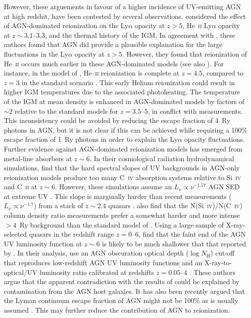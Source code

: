 \documentclass[a4paper,fleqn,usenatbib]{mnras}
\begin{document}
However, these arguements in favour of a higher incidence of
UV-emitting AGN at high redshit, have been contested by several
observations.  \citet{2016arXiv160706467D} considered the effect of
AGN-dominated reionization on the Ly$\alpha$ opacity at $z>5$,
He~\textsc{ii} Ly$\alpha$ opacity at $z\sim 3.1$--$3.3$, and the
thermal history of the IGM.  In agreement with
\citet{2015MNRAS.453.2943C}, these authors found that AGN did provide
a plausible explanation for the large fluctuations in the Ly$\alpha$
opacity at $z>5$.  However, they found that reionization of
He~\textsc{ii} occurs much earlier in these AGN-dominated models (see
also \citealt{2016arXiv160602719M}).  For instance, in the model of
\citet{2015ApJ...813L...8M}, He~\textsc{ii} reionization is complete
at $z=4.5$, compared to $z=3$ in the standard scenario
\citep{2012ApJ...746..125H}.  This early Helium reionization could
result in higher IGM temperatures due to the associated photoheating.
The temperature of the IGM at mean density is enhanced in
AGN-dominated models by factors of $\sim 2$ relative to the standard
models for $z=3.5$--$5$, in conflict with measurements.  This
inconsistency could be avoided by reducing the escape fraction of 4~Ry
photons in AGN, but it is not clear if this can be achieved while
requiring a 100\% escape fraction of 1~Ry photons in order to explain
the Ly$\alpha$ opacity fluctuations.  Further evidence against
AGN-dominated reionization models has emerged from metal-line
absorbers at $z\sim 6$.  In their cosmological radiation
hydrodynamical simulations, \citet{2016MNRAS.459.2299F} find that the
hard spectral slopes of UV backgrounds in AGN-only reionization models
produce too many C~\textsc{iv} absorption systems relative to
Si~\textsc{iv} and C~\textsc{ii} at $z\sim 6$.  However, these
simulations assume an $L_\nu\propto\nu^{-1.57}$ AGN SED at extreme UV
\citep{2001AJ....122..549V, 2002ApJ...579..500T, 2012ApJ...746..125H}.
This slope is marginally harder than recent measurements
($L_\nu\propto\nu^{-1.7}$) from a stack of $z\sim 2.4$ quasars
\citep{2015MNRAS.449.4204L}.  \citet{2016MNRAS.459.2299F} also find
that the N(Si~\textsc{iv})/N(C~\textsc{iv}) column density ratio
measurements prefer a somewhat harder and more intense $>4$~Ry
background than the standard model of \citet{2012ApJ...746..125H}.
Using a large sample of X-ray-selected quasars in the redshift range
$z=0$--$6$, \citet{2017MNRAS.465.1915R} find that the faint end of the
AGN UV luminosity function at $z\sim 6$ is likely to be much shallower
that that reported by \citet{2015AA...578A..83G}.  In their analysis,
\citet{2017MNRAS.465.1915R} use an AGN obscuration optical depth
($\log N_\mathrm{H}$) cut-off that reproduces low-redshift AGN UV
luminosity functions and an X-ray-to-optical/UV luminosity ratio
calibrated at redshifts $z=0.05$--$4$ \citep{2010A&A...512A..34L}.
These authors argue that the apparent contradiction with the results
of \citet{2015AA...578A..83G} could be explained by contamination
from the AGN host galaxies.  It has also been recently argued that the
Lyman continuum escape fraction of AGN might not be 100\% as is
usually assumed \citep{2017MNRAS.465..302M}.  This may further reduce
the contribution of AGN to reionization.
\end{document}
